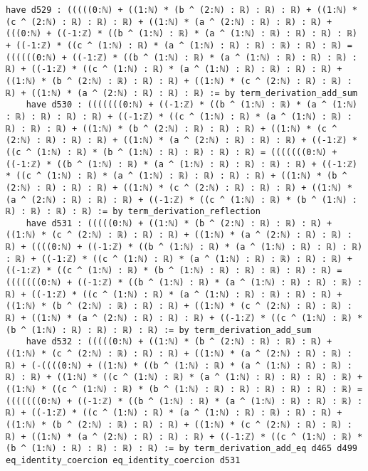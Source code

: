 \documentclass{article}
\begin{document}
\begin{tcolorbox}[colback=white!10, width=\linewidth]
\begin{lstlisting}[language=Lean4]
    have d529 : (((((0:ℕ) + ((1:ℕ) * (b ^ (2:ℕ) : ℝ) : ℝ) : ℝ) + ((1:ℕ) * (c ^ (2:ℕ) : ℝ) : ℝ) : ℝ) + ((1:ℕ) * (a ^ (2:ℕ) : ℝ) : ℝ) : ℝ) + (((0:ℕ) + ((-1:ℤ) * ((b ^ (1:ℕ) : ℝ) * (a ^ (1:ℕ) : ℝ) : ℝ) : ℝ) : ℝ) + ((-1:ℤ) * ((c ^ (1:ℕ) : ℝ) * (a ^ (1:ℕ) : ℝ) : ℝ) : ℝ) : ℝ) : ℝ) = ((((((0:ℕ) + ((-1:ℤ) * ((b ^ (1:ℕ) : ℝ) * (a ^ (1:ℕ) : ℝ) : ℝ) : ℝ) : ℝ) + ((-1:ℤ) * ((c ^ (1:ℕ) : ℝ) * (a ^ (1:ℕ) : ℝ) : ℝ) : ℝ) : ℝ) + ((1:ℕ) * (b ^ (2:ℕ) : ℝ) : ℝ) : ℝ) + ((1:ℕ) * (c ^ (2:ℕ) : ℝ) : ℝ) : ℝ) + ((1:ℕ) * (a ^ (2:ℕ) : ℝ) : ℝ) : ℝ) := by term_derivation_add_sum
    have d530 : (((((((0:ℕ) + ((-1:ℤ) * ((b ^ (1:ℕ) : ℝ) * (a ^ (1:ℕ) : ℝ) : ℝ) : ℝ) : ℝ) + ((-1:ℤ) * ((c ^ (1:ℕ) : ℝ) * (a ^ (1:ℕ) : ℝ) : ℝ) : ℝ) : ℝ) + ((1:ℕ) * (b ^ (2:ℕ) : ℝ) : ℝ) : ℝ) + ((1:ℕ) * (c ^ (2:ℕ) : ℝ) : ℝ) : ℝ) + ((1:ℕ) * (a ^ (2:ℕ) : ℝ) : ℝ) : ℝ) + ((-1:ℤ) * ((c ^ (1:ℕ) : ℝ) * (b ^ (1:ℕ) : ℝ) : ℝ) : ℝ) : ℝ) = (((((((0:ℕ) + ((-1:ℤ) * ((b ^ (1:ℕ) : ℝ) * (a ^ (1:ℕ) : ℝ) : ℝ) : ℝ) : ℝ) + ((-1:ℤ) * ((c ^ (1:ℕ) : ℝ) * (a ^ (1:ℕ) : ℝ) : ℝ) : ℝ) : ℝ) + ((1:ℕ) * (b ^ (2:ℕ) : ℝ) : ℝ) : ℝ) + ((1:ℕ) * (c ^ (2:ℕ) : ℝ) : ℝ) : ℝ) + ((1:ℕ) * (a ^ (2:ℕ) : ℝ) : ℝ) : ℝ) + ((-1:ℤ) * ((c ^ (1:ℕ) : ℝ) * (b ^ (1:ℕ) : ℝ) : ℝ) : ℝ) : ℝ) := by term_derivation_reflection
    have d531 : (((((0:ℕ) + ((1:ℕ) * (b ^ (2:ℕ) : ℝ) : ℝ) : ℝ) + ((1:ℕ) * (c ^ (2:ℕ) : ℝ) : ℝ) : ℝ) + ((1:ℕ) * (a ^ (2:ℕ) : ℝ) : ℝ) : ℝ) + ((((0:ℕ) + ((-1:ℤ) * ((b ^ (1:ℕ) : ℝ) * (a ^ (1:ℕ) : ℝ) : ℝ) : ℝ) : ℝ) + ((-1:ℤ) * ((c ^ (1:ℕ) : ℝ) * (a ^ (1:ℕ) : ℝ) : ℝ) : ℝ) : ℝ) + ((-1:ℤ) * ((c ^ (1:ℕ) : ℝ) * (b ^ (1:ℕ) : ℝ) : ℝ) : ℝ) : ℝ) : ℝ) = (((((((0:ℕ) + ((-1:ℤ) * ((b ^ (1:ℕ) : ℝ) * (a ^ (1:ℕ) : ℝ) : ℝ) : ℝ) : ℝ) + ((-1:ℤ) * ((c ^ (1:ℕ) : ℝ) * (a ^ (1:ℕ) : ℝ) : ℝ) : ℝ) : ℝ) + ((1:ℕ) * (b ^ (2:ℕ) : ℝ) : ℝ) : ℝ) + ((1:ℕ) * (c ^ (2:ℕ) : ℝ) : ℝ) : ℝ) + ((1:ℕ) * (a ^ (2:ℕ) : ℝ) : ℝ) : ℝ) + ((-1:ℤ) * ((c ^ (1:ℕ) : ℝ) * (b ^ (1:ℕ) : ℝ) : ℝ) : ℝ) : ℝ) := by term_derivation_add_sum
    have d532 : (((((0:ℕ) + ((1:ℕ) * (b ^ (2:ℕ) : ℝ) : ℝ) : ℝ) + ((1:ℕ) * (c ^ (2:ℕ) : ℝ) : ℝ) : ℝ) + ((1:ℕ) * (a ^ (2:ℕ) : ℝ) : ℝ) : ℝ) + (-((((0:ℕ) + ((1:ℕ) * ((b ^ (1:ℕ) : ℝ) * (a ^ (1:ℕ) : ℝ) : ℝ) : ℝ) : ℝ) + ((1:ℕ) * ((c ^ (1:ℕ) : ℝ) * (a ^ (1:ℕ) : ℝ) : ℝ) : ℝ) : ℝ) + ((1:ℕ) * ((c ^ (1:ℕ) : ℝ) * (b ^ (1:ℕ) : ℝ) : ℝ) : ℝ) : ℝ) : ℝ) : ℝ) = (((((((0:ℕ) + ((-1:ℤ) * ((b ^ (1:ℕ) : ℝ) * (a ^ (1:ℕ) : ℝ) : ℝ) : ℝ) : ℝ) + ((-1:ℤ) * ((c ^ (1:ℕ) : ℝ) * (a ^ (1:ℕ) : ℝ) : ℝ) : ℝ) : ℝ) + ((1:ℕ) * (b ^ (2:ℕ) : ℝ) : ℝ) : ℝ) + ((1:ℕ) * (c ^ (2:ℕ) : ℝ) : ℝ) : ℝ) + ((1:ℕ) * (a ^ (2:ℕ) : ℝ) : ℝ) : ℝ) + ((-1:ℤ) * ((c ^ (1:ℕ) : ℝ) * (b ^ (1:ℕ) : ℝ) : ℝ) : ℝ) : ℝ) := by term_derivation_add_eq d465 d499 eq_identity_coercion eq_identity_coercion d531

\end{lstlisting}
\end{tcolorbox}
\end{document}
